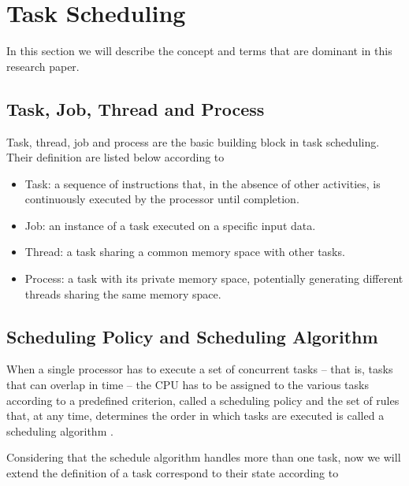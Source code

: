 
\section{Task Scheduling}
In this section we will describe the concept and terms that are dominant in this research paper.

\subsection{Task, Job, Thread and Process}

Task, thread, job and process  are the basic building block in task scheduling. Their definition are listed below according to \cite{b4}

\begin{itemize}
\item Task: a sequence of instructions that, in the absence of other activities, is continuously executed by the processor until completion.
\item Job: an instance of a task executed on a specific input data.
\item Thread: a task sharing a common memory space with other tasks.
\item Process: a task with its private memory space, potentially generating different threads sharing the same memory space.
\end{itemize}


\subsection{Scheduling Policy and Scheduling Algorithm }

When a single processor has to execute a set of concurrent tasks – that is, tasks that can overlap in time – the CPU has to be assigned to the various tasks according to a predefined criterion, called a scheduling policy and the set of rules that, at any time, determines the order in which tasks are executed is called a scheduling algorithm \cite{b5}.

Considering that the schedule algorithm handles more than one task, now we will extend the definition of a task correspond to their state according to \cite{b5}

